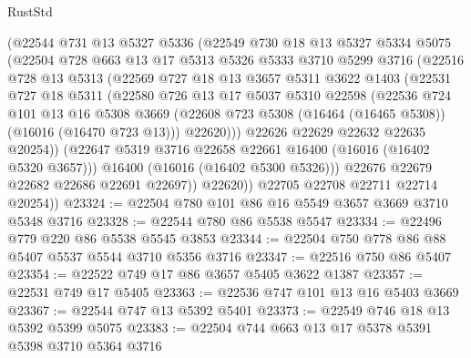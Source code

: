 \begin{lexlean}{RustStd}
\begin{coremodule}
            (@22544
              @731
              @13
              @5327
              @5336
              (@22549
                @730
                @18
                @13
                @5327
                @5334
                @5075
                (@22504
                  @728
                  @663
                  @13
                  @17
                  @5313
                  @5326
                  @5333
                  @3710
                  @5299
                  @3716
                  (@22516
                    @728
                    @13
                    @5313
                    (@22569
                      @727
                      @18
                      @13
                      @3657
                      @5311
                      @3622
                      @1403
                      (@22531
                        @727
                        @18
                        @5311
                        (@22580
                          @726
                          @13
                          @17
                          @5037
                          @5310
                          @22598
                          (@22536
                            @724
                            @101
                            @13
                            @16
                            @5308
                            @3669
                            (@22608 @723 @5308 (@16464 (@16465 @5308)) (@16016 (@16470 @723 @13)))
                            @22620)))
                      @22626
                      @22629
                      @22632
                      @22635
                      @20254))
                  (@22647 @5319 @3716 @22658 @22661 @16400 (@16016 (@16402 @5320 @3657)))
                  @16400
                  (@16016 (@16402 @5300 @5326)))
                @22676
                @22679
                @22682
                @22686
                @22691
                @22697))
            @22620))
        @22705
        @22708
        @22711
        @22714
        @20254))
@23324 := @22504 @780 @101 @86 @16 @5549 @3657 @3669 @3710 @5348 @3716
@23328 := @22544 @780 @86 @5538 @5547
@23334 := @22496 @779 @220 @86 @5538 @5545 @3853
@23344 := @22504 @750 @778 @86 @88 @5407 @5537 @5544 @3710 @5356 @3716
@23347 := @22516 @750 @86 @5407
@23354 := @22522 @749 @17 @86 @3657 @5405 @3622 @1387
@23357 := @22531 @749 @17 @5405
@23363 := @22536 @747 @101 @13 @16 @5403 @3669
@23367 := @22544 @747 @13 @5392 @5401
@23373 := @22549 @746 @18 @13 @5392 @5399 @5075
@23383 := @22504 @744 @663 @13 @17 @5378 @5391 @5398 @3710 @5364 @3716

\end{coremodule}
\end{lexlean}
